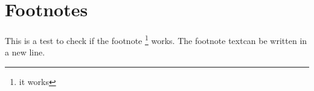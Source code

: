 \documentclass[12pt]{article}
\begin{document}
\section{Footnotes}

This is a test to check if the footnote \footnote[10]{it works} works.
The footnote text\footnotemark can be written in a new line.\\
      
\end{document}
